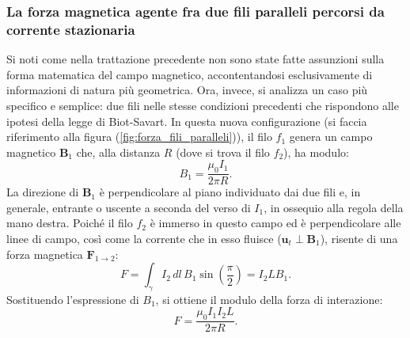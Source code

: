 \documentclass[a4paper,11pt]{report}
\begin{document}
\subsubsection{La forza magnetica agente fra due fili paralleli percorsi da corrente stazionaria}
Si noti come nella trattazione precedente non sono state fatte assunzioni sulla forma matematica del campo magnetico, accontentandosi esclusivamente di informazioni di natura più geometrica. Ora, invece, si analizza un caso più specifico e semplice: due fili nelle stesse condizioni precedenti che rispondono alle ipotesi della legge di Biot-Savart.
In questa nuova configurazione (si faccia riferimento alla figura (\ref{fig:forza_fili_paralleli})), il filo $f_1$ genera un campo magnetico $\bm{B}_1$ che, alla distanza $R$ (dove si trova il filo $f_2$), ha modulo:
\begin{equation}
    B_1 = \frac{\mu_0 I_1}{2\pi R}.
\end{equation}
La direzione di $\bm{B}_1$ è perpendicolare al piano individuato dai due fili e, in generale, entrante o uscente a seconda del verso di $I_1$, in ossequio alla regola della mano destra. 
Poiché il filo $f_2$ è immerso in questo campo ed è perpendicolare alle linee di campo, così come la corrente che in esso fluisce ($\bm{u}_t \perp \bm{B}_1$), risente di una forza magnetica $\bm{F}_{1 \to 2}$:
\begin{equation}
    F = \int_\gamma I_2 \, dl \, B_1 \sin\left(\frac{\pi}{2}\right) = I_2 L B_1.
\end{equation}
Sostituendo l'espressione di $B_1$, si ottiene il modulo della forza di interazione:
\begin{equation}
    F = \frac{\mu_0 I_1 I_2 L}{2\pi R}.
    \label{eq:forza_ampere}
\end{equation}
\end{document}
